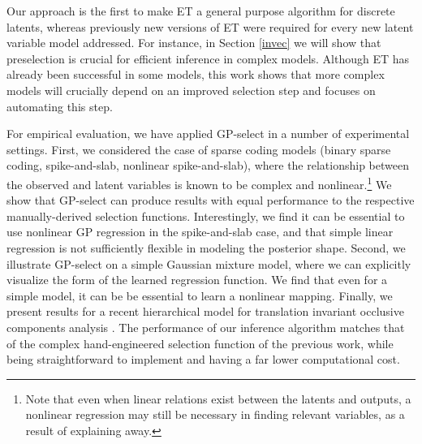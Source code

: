 Our approach is the first to make ET a general purpose algorithm for discrete latents,%
 whereas previously new versions of ET were required for every new latent variable model addressed. 
For instance, in Section \ref{invec} we will show that preselection is crucial for efficient inference in complex models. 
Although ET has already been successful in some models, this work shows that more complex models will crucially depend on an improved selection step and focuses on automating this step.

For empirical evaluation, we have applied GP-select in a number of experimental settings.
First, we considered the case of sparse coding models (binary sparse coding,
spike-and-slab, nonlinear spike-and-slab), where the relationship between the
observed and latent variables is known to be complex and nonlinear.\footnote{Note that
 even when linear relations exist between the latents and outputs, a nonlinear
regression may still be necessary in finding relevant variables,
as a result of explaining away.}
%
We show that GP-select can produce results with equal performance to the respective manually-derived selection functions.
%
Interestingly, we find it can be essential to use nonlinear GP regression
in the spike-and-slab case, and that simple linear regression is not
sufficiently flexible in modeling the posterior shape.
%
Second, we illustrate GP-select on a simple Gaussian mixture model,
where we can explicitly visualize the form of the learned regression function.
We find that even for a simple model, it can be be essential to learn a nonlinear mapping.
%
Finally, we present results
for a recent hierarchical model for translation invariant occlusive components analysis
\citep{DaiLucke2014}.
The performance of our inference algorithm matches that of the complex
hand-engineered selection function of the previous work, while being straightforward
to implement and having a far lower computational cost.


